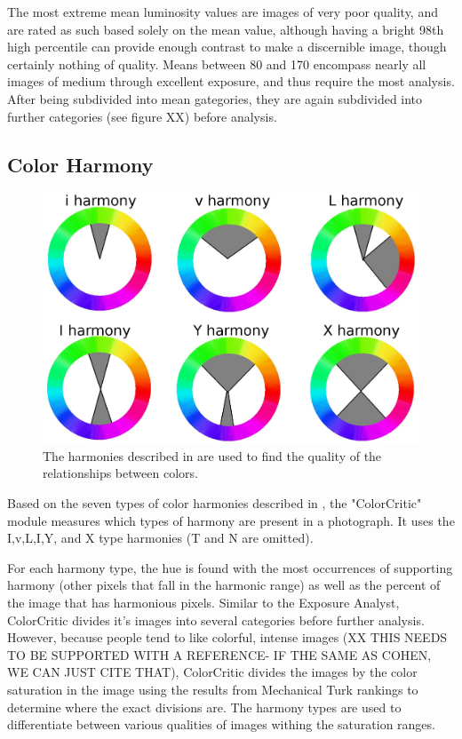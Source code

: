 \documentclass[10pt,twocolumn,letterpaper]{article}
\begin{document}
The most extreme mean luminosity values are images of very poor quality, and are rated as such based solely on the mean value, although having a bright 98th high percentile can provide enough contrast to make a discernible image, though certainly nothing of quality. Means between 80 and 170 encompass nearly all images of medium through excellent exposure, and thus require the most analysis. After being subdivided into mean gategories, they are again subdivided into further categories (see figure XX) before analysis.

\subsection{Color Harmony}   
\begin{figure}[t]
  \centering
    \includegraphics[scale=0.38,clip]{colorharmony.eps}
  \caption{The harmonies described in \cite{COL:COL10004} are used to find the quality of the relationships between colors.}
\end{figure}

Based on the seven types of color harmonies described in \cite{Cohen-Or:2006:CH:1179352.1141933}, the "ColorCritic" module measures which types of harmony are present in a photograph. It uses the I,v,L,I,Y, and X type harmonies (T and N are omitted).

For each harmony type, the hue is found with the most occurrences of supporting harmony (other pixels that fall in the harmonic range) as well as the percent of the image that has harmonious pixels. Similar to the Exposure Analyst, ColorCritic divides it's images into several categories before further analysis. However, because people tend to like colorful, intense images (XX THIS NEEDS TO BE SUPPORTED WITH A REFERENCE- IF THE SAME AS COHEN, WE CAN JUST CITE THAT), ColorCritic divides the images by the color saturation in the image using the results from Mechanical Turk rankings to determine where the exact divisions are. The harmony types are used to differentiate between various qualities of images withing the saturation ranges.
\end{document}
